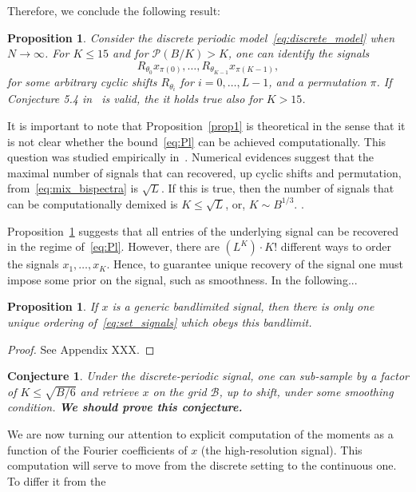 \documentclass[english,12pt]{article}
\newcommand{\TODO}[1]{{\color{red}{[#1]}}}
\numberwithin{equation}{section}
\numberwithin{mytheorem}{section} %
\newtheorem{conj}[mytheorem]{Conjecture}
\newtheorem{prop}[mytheorem]{Proposition}
\begin{document}
Therefore, we conclude the following result:
\begin{prop} \label{prop1}
Consider the  discrete periodic model~\eqref{eq:discrete_model} when $N\to\infty$. 
For $K\leq 15$ and for $\mathcal{P}(B/K)>K$, one can identify the signals 
\begin{equation} \label{eq:set_signals}
R_{\theta_0}x_{\pi(0)}, \ldots,R_{\theta_{K-1}}x_{\pi(K-1)},
\end{equation}
for some arbitrary cyclic shifts $R_{\theta_i}$ for $i=0,\ldots,L-1$, and a permutation $\pi$.
If Conjecture 5.4 in~\cite{bandeira2017estimation} is valid, the it holds true also for $K>15$.
\end{prop}	

It is important to note that Proposition~\eqref{prop1} is theoretical in the sense that it is not clear whether the bound~\eqref{eq:Pl} can be achieved computationally.  
This question was studied empirically in~\cite{boumal2018heterogeneous}. Numerical evidences suggest that the maximal number of signals that can recovered, up cyclic shifts and permutation, from~\eqref{eq:mix_bispectra} is $\sqrt{L}$. If this is true, then the number of signals that can be computationally 
demixed is $K\leq \sqrt{L}$, or, $K\sim B^{1/3}$.  \TODO{Alex's thesis}.

Proposition~\ref{prop1} suggests that all entries of the underlying signal can be recovered in the regime of~\eqref{eq:Pl}. However, there are $(L^K)\cdot K!$ \TODO{check this number}  different ways to order the signals $x_1,\ldots,x_K$. Hence, to guarantee unique recovery of the signal one must impose some prior on the signal, such as smoothness. In the following... 

\begin{prop} \label{prop:bandlimit}
If $x$ is a generic bandlimited signal, then there is only one unique ordering of~\eqref{eq:set_signals} which obeys this bandlimit. 
\end{prop}	
\begin{proof}
	See Appendix XXX.
\end{proof}

\begin{conj} \label{conj1}
	Under the discrete-periodic signal, one can sub-sample by a factor of  	$K\leq \sqrt{B/6}$ and retrieve  $x$ on the grid $\mathcal{B}$, up to shift, under some smoothing condition. \textbf{We should prove this conjecture.}
\end{conj}	

We are now turning our attention to explicit computation of the moments as a function of the Fourier coefficients of $x$ (the high-resolution signal). This computation will serve to move from the discrete setting to the continuous one. To differ it from the  
\end{document}
